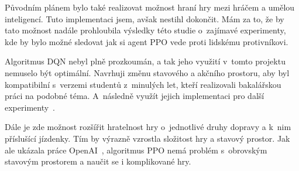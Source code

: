 Původním plánem bylo také realizovat možnost hraní hry mezi hráčem a umělou inteligencí.
Tuto implementaci jsem, avšak nestihl dokončit.
Mám za to, že by tato možnost nadále prohloubila výsledky této studie o~zajímavé experimenty, kde by bylo možné sledovat jak si agent PPO vede proti lidskému protivníkovi.

Algoritmus DQN nebyl plně prozkoumán, a tak jeho využití v~tomto projektu nemuselo být optimální.
Navrhuji změnu stavového a akčního prostoru, aby byl kompatibilní s~verzemi studentů z~minulých let, kteří realizovali bakalářskou práci na podobné téma.
A~následně využít jejich implementaci pro další experimenty~\cite{Hrklova2023thesis}.

Dále je zde možnost rozšířit hratelnost hry o~jednotlivé druhy dopravy a k~nim příslušící jízdenky.
Tím by výrazně vzrostla složitost hry a stavový prostor.
Jak ale ukázala práce OpenAI~\cite{Dota2}, algoritmus PPO nemá problém s~obrovským stavovým prostorem a naučit se i komplikované hry.




%
